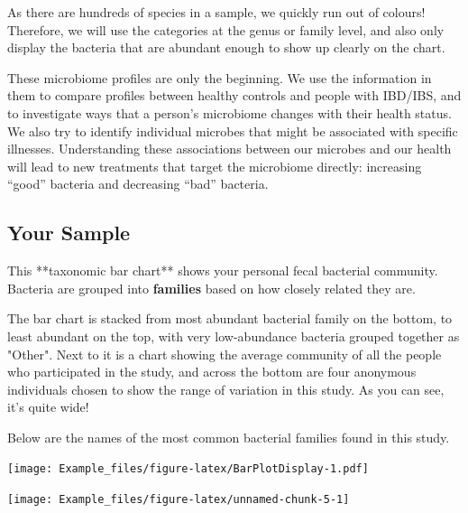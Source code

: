 \documentclass[
]{article}
\begin{document}
As there are hundreds of species in a sample, we quickly run out of
colours! Therefore, we will use the categories at the genus or family
level, and also only display the bacteria that are abundant enough to
show up clearly on the chart.

These microbiome profiles are only the beginning. We use the information
in them to compare profiles between healthy controls and people with
IBD/IBS, and to investigate ways that a person's microbiome changes with
their health status. We also try to identify individual microbes that
might be associated with specific illnesses. Understanding these
associations between our microbes and our health will lead to new
treatments that target the microbiome directly: increasing ``good''
bacteria and decreasing ``bad'' bacteria.

\newpage

\vspace*{\fill}

\begin{multicols}{2}

\section{Your Sample}
\begin{small}
This **taxonomic bar chart** shows your personal fecal bacterial community. 
Bacteria are grouped into \textbf{families} based on how closely related
they are.

The bar chart is stacked from most abundant bacterial family on the 
bottom, to least abundant on the top, with very low-abundance 
bacteria grouped together as "Other". Next to it is a chart showing
the average community of all the people who participated in the study,
and across the bottom are four anonymous individuals chosen to show
the range of variation in this study. As you can see, it's quite wide!

Below are the names of the most common bacterial families found in this study.
\end{small}
\columnbreak

\texttt{[image: Example\_files/figure-latex/BarPlotDisplay-1.pdf]}

\end{multicols}

\begin{center}\texttt{[image: Example\_files/figure-latex/unnamed-chunk-5-1]} \end{center}
\vspace*{\fill}
\newpage
\end{document}
